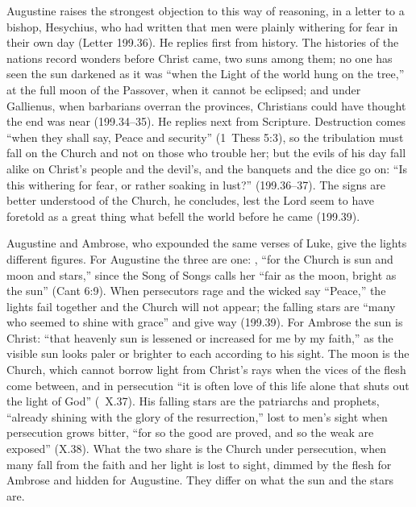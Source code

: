 Augustine raises the strongest objection to this way of reasoning, in a
letter to a bishop, Hesychius, who had written that men were plainly
withering for fear in their own day (Letter 199.36). He replies first from
history. The histories of the nations record wonders before Christ came, two
suns among them; no one has seen the sun darkened as it was ``when the Light
of the world hung on the tree,'' at the full moon of the Passover, when it
cannot be eclipsed; and under Gallienus, when barbarians overran the
provinces, Christians could have thought the end was near (199.34--35). He
replies next from Scripture. Destruction comes ``when they shall say, Peace
and security'' (1~Thess 5:3), so the tribulation must fall on the Church and
not on those who trouble her; but the evils of his day fall alike on Christ's
people and the devil's, and the banquets and the dice go on: ``Is this
withering for fear, or rather soaking in lust?'' (199.36--37). The signs are
better understood of the Church, he concludes, lest the Lord seem to have
foretold as a great thing what befell the world before he came (199.39).

Augustine and Ambrose, who expounded the same verses of Luke, give the lights
different figures. For Augustine the three are one: , ``for the Church is sun and moon and stars,'' since
the Song of Songs calls her ``fair as the moon, bright as the sun'' (Cant
6:9). When persecutors rage and the wicked say ``Peace,'' the lights fail
together and the Church will not appear; the falling stars are ``many who
seemed to shine with grace'' and give way (199.39). For Ambrose the sun is
Christ: ``that heavenly sun is lessened or increased for me by my faith,'' as
the visible sun looks paler or brighter to each according to his sight. The
moon is the Church, which cannot borrow light from Christ's rays when the
vices of the flesh come between, and in persecution ``it is often love of this
life alone that shuts out the light of God'' (~X.37). His
falling stars are the patriarchs and prophets, ``already shining with the
glory of the resurrection,'' lost to men's sight when persecution grows
bitter, ``for so the good are proved, and so the weak are exposed'' (X.38).
What the two share is the Church under persecution, when many fall from the
faith and her light is lost to sight, dimmed by the flesh for Ambrose and
hidden for Augustine. They differ on what the sun and the stars are.

